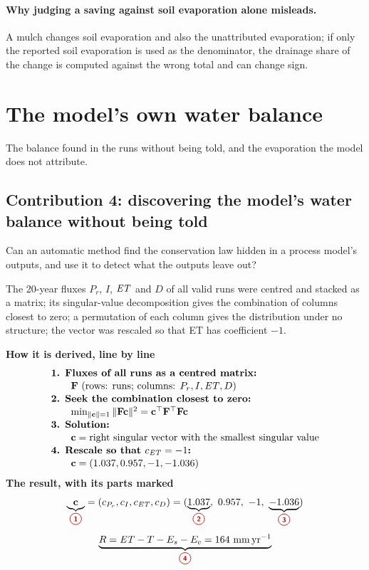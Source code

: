 \paragraph{Why judging a saving against soil evaporation alone misleads.} A mulch changes soil evaporation and also the unattributed evaporation; if only the reported soil evaporation is used as the denominator, the drainage share of the change is computed against the wrong total and can change sign.


\section{The model's own water balance}
The balance found in the runs without being told, and the evaporation the model does not attribute.

\subsection{Contribution 4: discovering the model's water balance without being told}\label{con:s1:4}
\begin{problem}
Can an automatic method find the conservation law hidden in a process model's outputs, and use it to detect what the outputs leave out?
\end{problem}
\begin{derivation}
The 20-year fluxes $P_r$, $I$, $\mathit{ET}$ and $D$ of all valid runs were centred and stacked as a matrix; its singular-value decomposition gives the combination of columns closest to zero; a permutation of each column gives the distribution under no structure; the vector was rescaled so that ET has coefficient $-1$.
\end{derivation}
\begin{keyresult}
\begin{pencil}
{\small\noindent\textbf{How it is derived, line by line}
\[\begin{array}{@{}l@{}}\textbf{1. Fluxes of all runs as a centred matrix:}\\[1pt]
\qquad \mathbf F\ (\text{rows: runs; columns: }P_r,I,\ET,D)\\[1pt]
\textbf{2. Seek the combination closest to zero:}\\[1pt]
\qquad \min_{\|\mathbf c\|=1}\|\mathbf F\mathbf c\|^2=\mathbf c^\top\mathbf F^\top\mathbf F\mathbf c\\[1pt]
\textbf{3. Solution:}\\[1pt]
\qquad \mathbf c=\text{right singular vector with the smallest singular value}\\[1pt]
\textbf{4. Rescale so that } c_{\ET}=-1\textbf{:}\\[1pt]
\qquad \mathbf c=(1.037,0.957,-1,-1.036)
\end{array}\]}
\noindent\textbf{The result, with its parts marked}
\[\underbrace{\mathbf c}_{\circled{1}}=(c_{P_r},c_I,c_{\ET},c_D)=(\underbrace{1.037}_{\circled{2}},\ 0.957,\ -1,\ \underbrace{-1.036}_{\circled{3}})\]
\[\underbrace{R=\ET-T-E_s-E_c=164\ \mathrm{mm\,yr^{-1}}}_{\circled{4}}\]
\end{pencil}
\end{keyresult}
